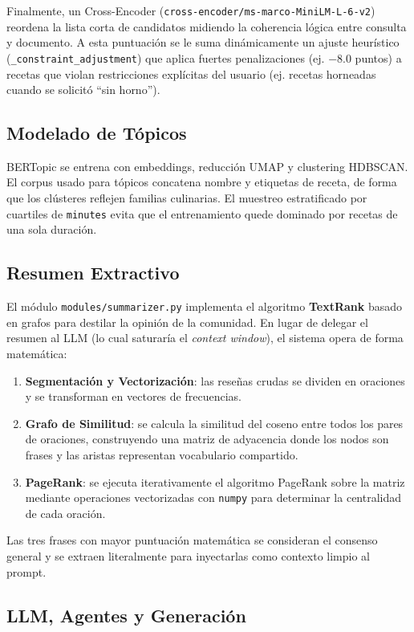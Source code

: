 \documentclass[11pt,a4paper]{article}
\begin{document}
Finalmente, un Cross-Encoder (\texttt{cross-encoder/ms-marco-MiniLM-L-6-v2}) reordena la lista corta de candidatos midiendo la coherencia lógica entre consulta y documento. A esta puntuación se le suma dinámicamente un ajuste heurístico (\texttt{\_constraint\_adjustment}) que aplica fuertes penalizaciones (ej. $-8.0$ puntos) a recetas que violan restricciones explícitas del usuario (ej. recetas horneadas cuando se solicitó ``sin horno'').

\subsection{Modelado de Tópicos}

BERTopic se entrena con embeddings, reducción UMAP y clustering HDBSCAN. El corpus usado para tópicos concatena nombre y etiquetas de receta, de forma que los clústeres reflejen familias culinarias. El muestreo estratificado por cuartiles de \texttt{minutes} evita que el entrenamiento quede dominado por recetas de una sola duración.

\subsection{Resumen Extractivo}

El módulo \texttt{modules/summarizer.py} implementa el algoritmo \textbf{TextRank} basado en grafos para destilar la opinión de la comunidad. En lugar de delegar el resumen al LLM (lo cual saturaría el \textit{context window}), el sistema opera de forma matemática:
\begin{enumerate}
    \item \textbf{Segmentación y Vectorización}: las reseñas crudas se dividen en oraciones y se transforman en vectores de frecuencias.
    \item \textbf{Grafo de Similitud}: se calcula la similitud del coseno entre todos los pares de oraciones, construyendo una matriz de adyacencia donde los nodos son frases y las aristas representan vocabulario compartido.
    \item \textbf{PageRank}: se ejecuta iterativamente el algoritmo PageRank sobre la matriz mediante operaciones vectorizadas con \texttt{numpy} para determinar la centralidad de cada oración.
\end{enumerate}
Las tres frases con mayor puntuación matemática se consideran el consenso general y se extraen literalmente para inyectarlas como contexto limpio al prompt.

\subsection{LLM, Agentes y Generación}
\end{document}
